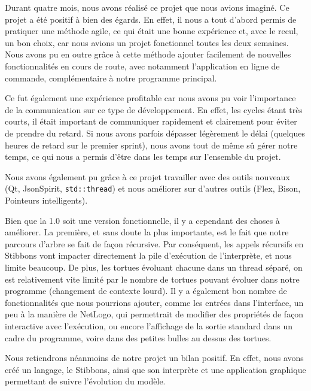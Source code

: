 Durant quatre mois, nous avons réalisé ce projet que nous avions imaginé.
Ce projet a été positif à bien des égards. En effet, il nous a tout d'abord permis de pratiquer une méthode agile, ce qui était une bonne expérience et, avec le recul, un bon choix, car nous avions un projet fonctionnel toutes les deux semaines.
Nous avons pu en outre grâce à cette méthode ajouter facilement de nouvelles fonctionnalités en cours de route, avec notamment l'application en ligne de commande, complémentaire à notre programme principal.

Ce fut également une expérience profitable car nous avons pu voir l'importance de la communication sur ce type de développement. En effet, les cycles étant très courts, il était important de communiquer rapidement et clairement pour éviter de prendre du retard. Si nous avons parfois dépasser légèrement le délai (quelques heures de retard sur le premier sprint), nous avons tout de même sû gérer notre temps, ce qui nous a permis d'être dans les temps sur l'ensemble du projet.

Nous avons également pu grâce à ce projet travailler avec des outils nouveaux (Qt, JsonSpirit, \verb|std::thread|) et nous améliorer sur d'autres outils (Flex, Bison, Pointeurs intelligents).

Bien que la 1.0 soit une version fonctionnelle, il y a cependant des choses à améliorer. La première, et sans doute la plus importante, est le fait que notre parcours d'arbre se fait de façon récursive. Par conséquent, les appels récursifs en Stibbons vont impacter directement la pile d'exécution de l'interprète, et nous limite beaucoup.
De plus, les tortues évoluant chacune dans un thread séparé, on est relativement vite limité par le nombre de tortues pouvant évoluer dans notre programme (changement de contexte lourd).
Il y a également bon nombre de fonctionnalités que nous pourrions ajouter, comme les entrées dans l'interface, un peu à la manière de NetLogo, qui permettrait de modifier des propriétés de façon interactive avec l'exécution, ou encore l'affichage de la sortie standard dans un cadre du programme, voire dans des petites bulles au dessus des tortues.

Nous retiendrons néanmoins de notre projet un bilan positif. En effet, nous avons créé un langage, le Stibbons, ainsi que son interprète et une application graphique permettant de suivre l'évolution du modèle.
